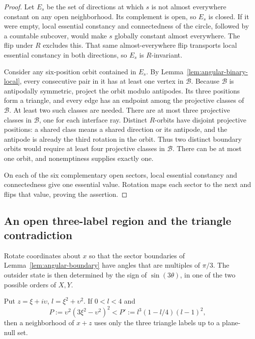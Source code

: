 \begin{proof}
Let \(E_s\) be the set of directions at which \(s\) is not
almost everywhere constant on any open neighborhood.
Its complement is open, so \(E_s\) is closed.  If it were
empty, local essential constancy and connectedness of the
circle, followed by a countable subcover, would make \(s\)
globally constant almost everywhere.  The flip under \(R\)
excludes this.  That same almost-everywhere flip transports
local essential constancy in both directions, so \(E_s\)
is \(R\)-invariant.

Consider any six-position orbit contained in \(E_s\).
By Lemma~\ref{lem:angular-binary-local}, every consecutive
pair in it has at least one vertex in \(\mathcal B\).
Because \(\mathcal B\) is antipodally symmetric, project
the orbit modulo antipodes.  Its three positions form a
triangle, and every edge has an endpoint among the
projective classes of \(\mathcal B\).  At least two such
classes are needed.  There are at most three projective
classes in \(\mathcal B\), one for each interface ray.
Distinct \(R\)-orbits have disjoint projective positions:
a shared class means a shared direction or its antipode,
and the antipode is already the third rotation in the orbit.
Thus two distinct boundary orbits would require at least
four projective classes in \(\mathcal B\).  There can be
at most one orbit, and nonemptiness supplies exactly one.

On each of the six complementary open sectors, local
essential constancy and connectedness give one essential
value.  Rotation maps each sector to the next and flips
that value, proving the assertion.
\end{proof}

\subsection{An open three-label region and the triangle contradiction}

Rotate coordinates about \(x\) so that the sector boundaries
of Lemma~\ref{lem:angular-boundary} have angles that are
multiples of \(\pi/3\).  The outsider state is then determined
by the sign of \(\sin(3\theta)\), in one of the two possible
orders of \(X,Y\).

\begin{lemma}\label{lem:angular-region}
Put \(z=\xi+i\upsilon\), \(l=\xi^2+\upsilon^2\).  If
\(0<l<4\) and
\begin{equation}\label{eq:source-27}
 P:=\upsilon^2(3\xi^2-\upsilon^2)^2
 <P':=l^3(1-l/4)(l-1)^2,
\end{equation}
then a neighborhood of \(x+z\) uses only the three triangle
labels up to a plane-null set.
\end{lemma}

